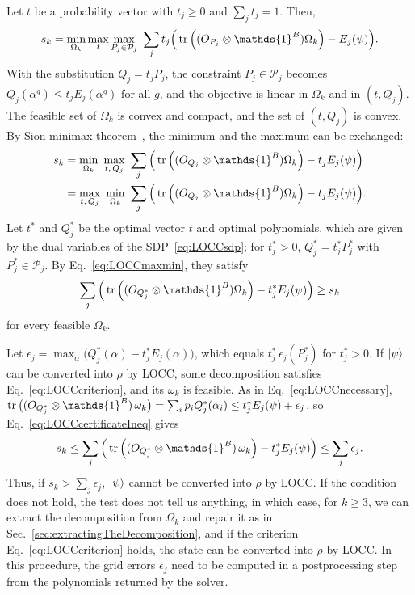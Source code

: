\documentclass[aps,pra,twocolumn,superscriptaddress]{revtex4-2}
\newcommand{\one}{\mathds{1}}
\newcommand{\I}{\one}
\renewcommand{\a}{\alpha}
\begin{document}
\begin{widetext}
Let $t$ be a probability vector with $t_j \geq 0$ and $\sum_j t_j = 1$. Then,
\begin{align}\label{eq:LOCCminmaxT}
    s_k=\min_{\Omega_k} \max_t \max_{P_j\in\mathcal{P}_j}\ \sum_j t_j\Big(\tr\left((O_{P_j}\otimes\I^B)\Omega_k\right)-E_j(\psi)\Big).
\end{align}
With the substitution $Q_j=t_jP_j$, the constraint $P_j\in\mathcal{P}_j$ becomes $Q_j(\a^g)\leq t_jE_j(\a^g)$ for all $g$, and the objective is linear in $\Omega_k$ and in $(t,Q_j)$. The feasible set of $\Omega_k$ is convex and compact, and the set of $(t,Q_j)$ is convex. By Sion minimax theorem~\cite{Sion1958}, the minimum and the maximum can be exchanged:
\begin{align}
    s_k&=\min_{\Omega_k}\ \max_{t,\,Q_j}\ \sum_j \Big(\tr\left((O_{Q_j}\otimes\I^B)\Omega_k\right)-t_jE_j(\psi)\Big)\nonumber\\
    &=\max_{t,\,Q_j}\ \min_{\Omega_k}\ \sum_j \Big(\tr\left((O_{Q_j}\otimes\I^B)\Omega_k\right)-t_jE_j(\psi)\Big).\label{eq:LOCCmaxmin}
\end{align}
Let $t^*$ and $Q_j^*$ be the optimal vector $t$ and optimal polynomials, which are given by the dual variables of the SDP~\eqref{eq:LOCCsdp}; for $t^*_j>0$, $Q^*_j=t^*_jP^*_j$ with $P^*_j\in\mathcal{P}_j$.
By Eq.~\eqref{eq:LOCCmaxmin}, they satisfy
\begin{equation}\label{eq:LOCCcertificateIneq}
    \sum_j \Big(\tr\left((O_{Q^*_j}\otimes\I^B)\Omega_k\right)-t^*_jE_j(\psi)\Big)\geq s_k
\end{equation}
for every feasible $\Omega_k$.

Let $\epsilon_j=\max_\a\big(Q^*_j(\a)-t^*_jE_j(\a)\big)$, which equals $t^*_j\,\epsilon_j(P^*_j)$ for $t^*_j>0$. If $\ket{\psi}$ can be converted into $\rho$ by LOCC, some decomposition satisfies Eq.~\eqref{eq:LOCCcriterion}, and its $\omega_k$ is feasible. As in Eq.~\eqref{eq:LOCCnecessary}, $\tr\big((O_{Q^*_j}\otimes\I^B)\,\omega_k\big)=\sum_ip_iQ^*_j(\a_i) \leq t^*_jE_j(\psi)+\epsilon_j$, so Eq.~\eqref{eq:LOCCcertificateIneq} gives
\begin{equation}
    s_k \leq \sum_j \Big(\tr\left((O_{Q^*_j}\otimes\I^B)\,\omega_k \right)-t^*_jE_j(\psi)\Big) \leq \sum_j \epsilon_j.
\end{equation}
Thus, if $s_k > \sum_j \epsilon_j$, $\ket{\psi}$ cannot be converted into $\rho$ by LOCC. If the condition does not hold, the test does not tell us anything, in which case, for $k\geq3$, we can extract the decomposition from $\Omega_k$ and repair it as in Sec.~\ref{sec:extractingTheDecomposition}, and if the criterion Eq.~\eqref{eq:LOCCcriterion} holds, the state can be converted into $\rho$ by LOCC.
In this procedure, the grid errors $\epsilon_j$ need to be computed in a postprocessing step from the polynomials returned by the solver.


\end{widetext}
\end{document}
